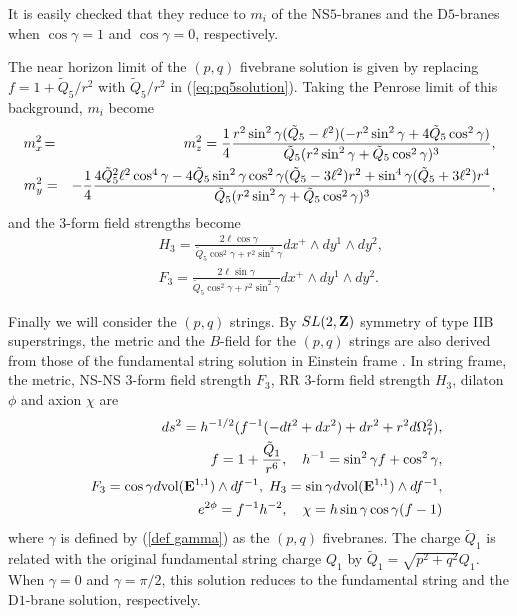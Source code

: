 \documentclass[a4paper,12pt]{article}
\begin{document}
It is easily checked that 
they reduce to $m_i$ of the NS$5$-branes and the D$5$-branes 
when $\cos\gamma=1$ and $\cos\gamma=0$, respectively.

The near horizon limit of the $(p,q)$ fivebrane solution
is given by replacing $f=1+\tilde{Q}_{5}/r^2$ 
with $\tilde{Q}_{5}/r^2$ in (\ref{eq:pq5solution}).
Taking the Penrose limit of this background, 
$m_i$ become
\begin{eqnarray}
 m_{x}^2&\!=\!& m_{z}^2=
{1\over4} {r^2\sin^2\gamma (\tilde{Q}_{5}-\ell^2)
(-r^2\sin^2\gamma +4\tilde{Q}_{5}\cos^2\gamma)\over
\tilde{Q}_{5}(r^2\sin^2\gamma +\tilde{Q}_{5}\cos^2\gamma)^3 },
\nonumber  \\
m_{y}^2&=&
-{1\over4} {
4\tilde{Q}_{5}^2\ell^2\cos^4\gamma
-4\tilde{Q}_{5}\sin^2\gamma\cos^2\gamma(\tilde{Q}_{5}-3\ell^2)r^2
+\sin^4\gamma (\tilde{Q}_{5}+3\ell^2)r^4
\over
\tilde{Q}_{5}(r^2\sin^2\gamma +\tilde{Q}_{5}\cos^2\gamma)^3 },
\end{eqnarray}
and the 3-form field strengths become
\begin{eqnarray}
&&H_3=\frac{2\ell\cos\gamma}{\tilde{Q}_5\cos^2\gamma +r^2\sin^2\gamma}
dx^{+}\wedge dy^1\wedge dy^2,
\nonumber \\
&&F_3=\frac{2\ell\sin\gamma}{\tilde{Q}_5\cos^2\gamma +r^2\sin^2\gamma}
dx^{+}\wedge dy^1\wedge dy^2.
\end{eqnarray}


\vspace{2mm}
\vspace{1mm}

Finally we will consider the $(p,q)$ strings.
By $SL(2,{\bf Z})$ symmetry of type IIB superstrings, 
the metric and the $B$-field for the $(p,q)$ strings are also derived 
from those of the fundamental string solution in Einstein frame \cite{Sc}.
In string frame, 
the metric, NS-NS $3$-form field strength $F_3$, 
RR $3$-form field strength $H_3$,
dilaton $\phi$ and axion $\chi$
are
\begin{eqnarray}
&&ds^2=h^{-1/2}(
f^{-1}(-dt^2+dx^2) + dr^2+ r^2 d\Omega_{7}^2),\nonumber\\
&&f=1+{\tilde{Q}_1\over  r^6},\quad
h^{-1}=\sin^2\gamma f +\cos^2\gamma, 
\nonumber \\
&&
F_3=\cos\gamma d{\rm vol}({\bf E}^{1,1})\wedge df^{-1},\;
H_3=\sin\gamma d{\rm vol}({\bf E}^{1,1})\wedge df^{-1},
\nonumber
\\
&&e^{2\phi}=f^{-1}h^{-2},\quad \chi =h\sin\gamma\cos\gamma (f-1)
\label{(p,q)string}
\end{eqnarray}
where $\gamma$ is defined by (\ref{def gamma}) as the $(p,q)$ fivebranes.
The charge $\tilde{Q}_1$ is related with the original fundamental string 
charge $Q_1$ by $\tilde{Q}_1=\sqrt{p^2+q^2}Q_1$.
When $\gamma=0$ and $\gamma=\pi/2$, 
this solution reduces to the fundamental string and the D$1$-brane
solution, respectively.
\end{document}
